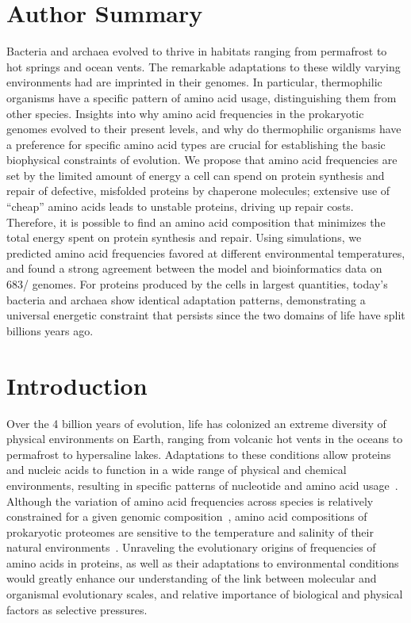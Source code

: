 \documentclass[10pt,letterpaper]{article}
\newcommand{\ARCHBACTERTOTAL}{683}
\begin{document}
\section*{Author Summary}

Bacteria and archaea evolved to thrive in habitats ranging from permafrost to hot springs and ocean vents. The remarkable adaptations to these wildly varying environments had are imprinted in their genomes. In particular, thermophilic organisms have a specific pattern of amino acid usage, distinguishing them from other species. Insights into why amino acid frequencies in the prokaryotic genomes evolved to their present levels, and why do thermophilic organisms have a preference for specific amino acid types are crucial for establishing the basic biophysical constraints of evolution. We propose that amino acid frequencies are set by the limited amount of energy a cell can spend on protein synthesis and repair of defective, misfolded proteins by chaperone molecules; extensive use of “cheap” amino acids leads to unstable proteins, driving up repair costs. 
Therefore, it is possible to find an amino acid composition that minimizes the total energy spent on protein synthesis and repair. Using simulations, we predicted amino acid frequencies favored at different environmental temperatures, and found a strong agreement between the model and bioinformatics data on \ARCHBACTERTOTAL/ genomes. For proteins produced by the cells in largest quantities, today’s bacteria and archaea show identical adaptation patterns, demonstrating a universal energetic constraint that persists since the two domains of life have split billions years ago.

\section*{Introduction}

Over the 4 billion years of evolution, life has colonized an extreme diversity of physical environments on Earth, ranging from volcanic hot vents in the oceans to permafrost to hypersaline lakes. Adaptations to these conditions allow proteins and nucleic acids to function in a wide range of physical and chemical environments, resulting in specific patterns of nucleotide and amino acid usage~\cite{Galtier1997Relationships,Kreil2001Identification,Zeldovich2007Protein,Berezovsky2007Positive,England2003Natural,Fukuchi2003Unique,Sghaier2013There,Sabath2013Growth}. Although the variation of amino acid frequencies across species is relatively constrained for a given genomic  composition~\cite{Krick2014Amino,Goncearenco2014Fundamental}, amino acid compositions of prokaryotic proteomes are sensitive to the temperature and salinity of their natural environments~\cite{Fukuchi2003Unique,Kreil2001Identification}. Unraveling the evolutionary origins of frequencies of amino acids in proteins, as well as their adaptations to environmental conditions would greatly enhance our understanding of the link between molecular and organismal evolutionary scales, and relative importance of biological and physical factors as selective pressures.
\end{document}
